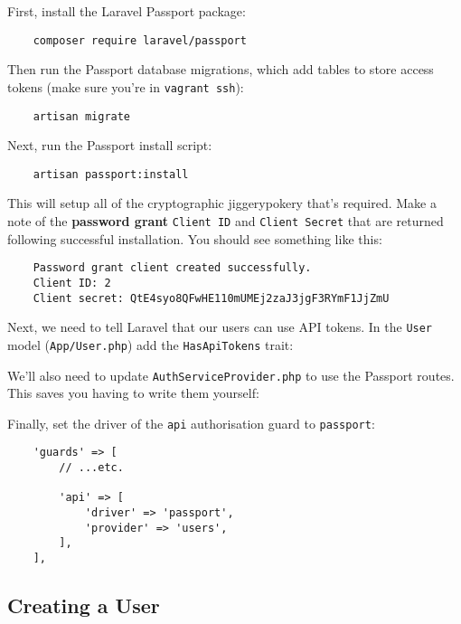 First, install the Laravel Passport package:

\begin{verbatim}
    composer require laravel/passport
\end{verbatim}

Then run the Passport database migrations, which add tables to store access tokens (make sure you're in \texttt{vagrant ssh}):

\begin{verbatim}
    artisan migrate
\end{verbatim}

Next, run the Passport install script:

\begin{verbatim}
    artisan passport:install
\end{verbatim}

This will setup all of the cryptographic jiggerypokery that's required. Make a note of the \textbf{password grant} \texttt{Client ID} and \texttt{Client Secret} that are returned following successful installation. You should see something like this:

\begin{verbatim}
    Password grant client created successfully.
    Client ID: 2
    Client secret: QtE4syo8QFwHE110mUMEj2zaJ3jgF3RYmF1JjZmU
\end{verbatim}

Next, we need to tell Laravel that our users can use API tokens. In the \texttt{User} model (\texttt{App/User.php}) add the \texttt{HasApiTokens} trait:



We'll also need to update \texttt{AuthServiceProvider.php} to use the Passport routes. This saves you having to write them yourself:



Finally, set the driver of the \texttt{api} authorisation guard to \texttt{passport}:

\begin{verbatim}
    'guards' => [
        // ...etc.

        'api' => [
            'driver' => 'passport',
            'provider' => 'users',
        ],
    ],
\end{verbatim}

\subsection{Creating a User}

